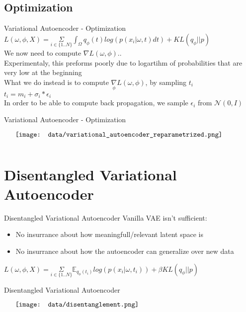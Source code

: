 \documentclass{beamer}
\begin{document}
\subsection{Optimization}
\begin{frame}{Variational Autoencoder - Optimization}
        $ L(\omega, \phi, X)= \underset{i \in \{1..N\}}{\Sigma} \int_\Omega q_\phi(t) log( p(x_i | \omega, t) dt) + KL( q_\phi || p ) $\\
	We now need to compute $\nabla L(\omega, \phi).$.\\
	Experimentaly, this preforms poorly due to logartihm of probabilities that are very low at the beginning\\
	What we do instead is to compute $\underset{\phi}{\nabla} L(\omega,\phi)$, by sampling $t_i$ \\
	$t_i = m_i + \sigma_i * \epsilon_i$ \\
	In order to be able to compute back propagation, we sample $\epsilon_i$ from  $\mathcal{N}(0,I)$
\end{frame}

\begin{frame}{Variational Autoencoder - Optimization}
    \begin{minipage}{5in}
    \centering
    $\vcenter{
    \texttt{[image: data/variational\_autoencoder\_reparametrized.png]} \\
    }$
    \end{minipage}
\end{frame}

\section{Disentangled Variational Autoencoder}
\begin{frame}{Disentangled Variational Autoencoder}
	Vanilla VAE isn't sufficient:
	\begin{itemize}
		\item No insurrance about how meaningfull/relevant latent space is 
		\item No insurrance about how the autoencoder can generalize over new data 
	\end{itemize}
	$ L(\omega, \phi, X)= \underset{i \in \{1..N\}}{\Sigma} \mathbb{E}_{q_\phi(t_i)} log( p(x_i | \omega, t_i)) + \beta KL( q_\phi || p ) $
\end{frame}

\begin{frame}{Disentangled Variational Autoencoder}
    \begin{minipage}{5in}
    \centering
    $\vcenter{
    \texttt{[image: data/disentanglement.png]} \\
    }$
    \end{minipage}
\end{frame}
\end{document}

